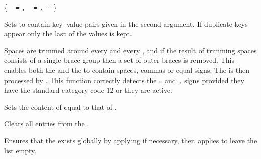 \documentclass[oneside]{book}
\begin{document}
\begin{function}{\propSetFromKeyval}
\begin{syntax}
 
\{
~  \verb|=|  \verb|,|
~  \verb|=|  \verb|,| $\cdots$
\}
\end{syntax}
Sets  to contain key--value pairs given in the second
argument.  If duplicate keys appear only the last of the values is kept.

Spaces are trimmed around every  and every ,
and if the result of trimming spaces consists of a single brace
group then a set of outer braces is removed.  This enables both the
 and the  to contain spaces, commas or equal
signs.  The  is then processed by .
This function correctly detects the \verb|=| and \verb|,| signs provided they
have the standard category code $12$ or they are active.
\begin{codehigh}
\propSetFromKeyval {}
\end{codehigh}
\end{function}

\begin{function}{\propSetEq}
\begin{syntax}
  
\end{syntax}
Sets the content of  equal to that of
.
\begin{codehigh}
\propSetFromKeyval {}
\propSetEq \lTmpbProp \lTmpaProp
\propVarLog \lTmpbProp
\end{codehigh}
\end{function}

\begin{function}{\propClear}
\begin{syntax}
 
\end{syntax}
Clears all entries from the .
\begin{codehigh}
\propClear \lTmpaProp
\end{codehigh}
\end{function}

\begin{function}{\propClearNew}
\begin{syntax}
 
\end{syntax}
Ensures that the  exists globally by applying 
if necessary, then applies  to leave the list empty.
\begin{codehigh}
\propClearNew \lFooSomeProp
\end{codehigh}
\end{function}
\end{document}
